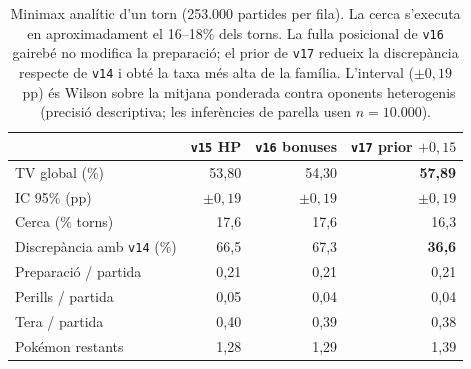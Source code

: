 \begin{table}[htbp]
\centering
\caption{Minimax analític d'un torn (253.000 partides per fila). La cerca s'executa en aproximadament el 16--18\% dels torns. La fulla posicional de \texttt{v16} gairebé no modifica la preparació; el prior de \texttt{v17} redueix la discrepància respecte de \texttt{v14} i obté la taxa més alta de la família. L'interval ($\pm 0{,}19$~pp) és Wilson sobre la mitjana ponderada contra oponents heterogenis (precisió descriptiva; les inferències de parella usen $n=10.000$).}
\label{tab:minimax_head}
\small
\begin{tabular}{lrrr}
\toprule
 & \textbf{\texttt{v15} HP} & \textbf{\texttt{v16} bonuses} & \textbf{\texttt{v17} prior $+0{,}15$} \\
\midrule
TV global (\%) & 53,80 & 54,30 & \textbf{57,89} \\
IC 95\% (pp) & $\pm 0{,}19$ & $\pm 0{,}19$ & $\pm 0{,}19$ \\
Cerca (\% torns) & 17,6 & 17,6 & 16,3 \\
Discrepància amb \texttt{v14} (\%) & 66,5 & 67,3 & \textbf{36,6} \\
Preparació / partida & 0,21 & 0,21 & 0,21 \\
Perills / partida & 0,05 & 0,04 & 0,04 \\
Tera / partida & 0,40 & 0,39 & 0,38 \\
Pokémon restants & 1,28 & 1,29 & 1,39 \\
\bottomrule
\end{tabular}
\end{table}
